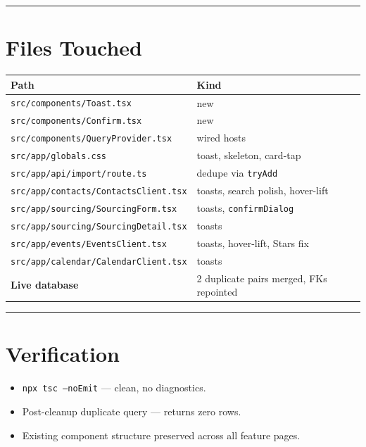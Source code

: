 \documentclass[11pt,a4paper]{article}
\begin{document}
\hrule
\bigskip

\section{Files Touched}

\begin{center}
\begin{tabular}{ll}
\toprule
\textbf{Path} & \textbf{Kind} \\
\midrule
\texttt{src/components/Toast.tsx}                & new \\
\texttt{src/components/Confirm.tsx}              & new \\
\texttt{src/components/QueryProvider.tsx}        & wired hosts \\
\texttt{src/app/globals.css}                     & toast, skeleton, card-tap \\
\texttt{src/app/api/import/route.ts}             & dedupe via \texttt{tryAdd} \\
\texttt{src/app/contacts/ContactsClient.tsx}     & toasts, search polish, hover-lift \\
\texttt{src/app/sourcing/SourcingForm.tsx}       & toasts, \texttt{confirmDialog} \\
\texttt{src/app/sourcing/SourcingDetail.tsx}     & toasts \\
\texttt{src/app/events/EventsClient.tsx}         & toasts, hover-lift, Stars fix \\
\texttt{src/app/calendar/CalendarClient.tsx}     & toasts \\
\midrule
\textbf{Live database} & 2 duplicate pairs merged, FKs repointed \\
\bottomrule
\end{tabular}
\end{center}

\hrule
\bigskip

\section{Verification}

\begin{itemize}[leftmargin=*]
  \item \texttt{npx tsc --noEmit} --- clean, no diagnostics.
  \item Post-cleanup duplicate query --- returns zero rows.
  \item Existing component structure preserved across all feature pages.
\end{itemize}
\end{document}
